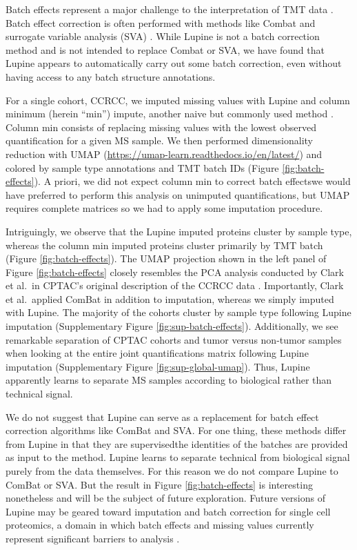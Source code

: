\documentclass{article}
\begin{document}
Batch effects represent a major challenge to the interpretation of TMT data \cite{multi-tmt}. Batch effect correction is often performed with methods like Combat \cite{combat} and surrogate variable analysis (SVA) \cite{sva}. While Lupine is not a batch correction method and is not intended to replace Combat or SVA, we have found that Lupine appears to automatically carry out some batch correction, even without having access to any batch structure annotations.

For a single cohort, CCRCC, we imputed missing values with Lupine and column minimum (herein ``min'') impute, another naive but commonly used method \cite{ms-impute-bench}. Column min consists of replacing missing values with the lowest observed quantification for a given MS sample. We then performed dimensionality reduction with UMAP (\url{https://umap-learn.readthedocs.io/en/latest/}) and colored by sample type annotations and TMT batch IDs (Figure \ref{fig:batch-effects}). A priori, we did not expect column min to correct batch effects\textemdash we would have preferred to perform this analysis on unimputed quantifications, but UMAP requires complete matrices so we had to apply some imputation procedure. 

Intriguingly, we observe that the Lupine imputed proteins cluster by sample type, whereas the column min imputed proteins cluster primarily by TMT batch (Figure \ref{fig:batch-effects}). The UMAP projection shown in the left panel of Figure \ref{fig:batch-effects} closely resembles the PCA analysis conducted by Clark et al.\ in CPTAC’s original description of the CCRCC data \cite{clark-2019}. Importantly, Clark et al.\ applied ComBat in addition to imputation, whereas we simply imputed with Lupine. The majority of the cohorts cluster by sample type following Lupine imputation (Supplementary Figure \ref{fig:sup-batch-effects}). Additionally, we see remarkable separation of CPTAC cohorts and tumor versus non-tumor samples when looking at the entire joint quantifications matrix following Lupine imputation (Supplementary Figure \ref{fig:sup-global-umap}). Thus, Lupine apparently learns to separate MS samples according to biological rather than technical signal. 

We do not suggest that Lupine can serve as a replacement for batch effect correction algorithms like ComBat and SVA. For one thing, these methods differ from Lupine in that they are supervised\textemdash the identities of the batches are provided as input to the method. Lupine learns to separate technical from biological signal purely from the data themselves. For this reason we do not compare Lupine to ComBat or SVA. But the result in Figure \ref{fig:batch-effects} is interesting nonetheless and will be the subject of future exploration. Future versions of Lupine may be geared toward imputation and batch correction for single cell proteomics, a domain in which batch effects and missing values currently represent significant barriers to analysis \cite{gatto-2023, carr-scprot}. 
\end{document}
